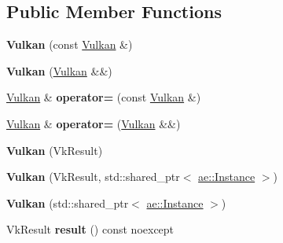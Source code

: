 \subsection*{Public Member Functions}
\begin{DoxyCompactItemize}
\item 
\hypertarget{classae_1_1error_1_1_vulkan_aa5a9db1b119cdba0e3833045764b8bc4}{}\label{classae_1_1error_1_1_vulkan_aa5a9db1b119cdba0e3833045764b8bc4} 
{\bfseries Vulkan} (const \hyperlink{classae_1_1error_1_1_vulkan}{Vulkan} \&)
\item 
\hypertarget{classae_1_1error_1_1_vulkan_a3b5c68df25fbe1acd003045560e2bb70}{}\label{classae_1_1error_1_1_vulkan_a3b5c68df25fbe1acd003045560e2bb70} 
{\bfseries Vulkan} (\hyperlink{classae_1_1error_1_1_vulkan}{Vulkan} \&\&)
\item 
\hypertarget{classae_1_1error_1_1_vulkan_a64ed9b7219098f2ebc4c9ecf3556e868}{}\label{classae_1_1error_1_1_vulkan_a64ed9b7219098f2ebc4c9ecf3556e868} 
\hyperlink{classae_1_1error_1_1_vulkan}{Vulkan} \& {\bfseries operator=} (const \hyperlink{classae_1_1error_1_1_vulkan}{Vulkan} \&)
\item 
\hypertarget{classae_1_1error_1_1_vulkan_a2809ae7dee506700aed8a1bf6206dd94}{}\label{classae_1_1error_1_1_vulkan_a2809ae7dee506700aed8a1bf6206dd94} 
\hyperlink{classae_1_1error_1_1_vulkan}{Vulkan} \& {\bfseries operator=} (\hyperlink{classae_1_1error_1_1_vulkan}{Vulkan} \&\&)
\item 
\hypertarget{classae_1_1error_1_1_vulkan_a190a9764342405a01574476f165219c4}{}\label{classae_1_1error_1_1_vulkan_a190a9764342405a01574476f165219c4} 
{\bfseries Vulkan} (Vk\+Result)
\item 
\hypertarget{classae_1_1error_1_1_vulkan_a6320fe60b0964cb06fdc7f9b5262fddd}{}\label{classae_1_1error_1_1_vulkan_a6320fe60b0964cb06fdc7f9b5262fddd} 
{\bfseries Vulkan} (Vk\+Result, std\+::shared\+\_\+ptr$<$ \hyperlink{classae_1_1_instance}{ae\+::\+Instance} $>$)
\item 
\hypertarget{classae_1_1error_1_1_vulkan_a2eea111f0a44c94afdf2034ffdecd5ab}{}\label{classae_1_1error_1_1_vulkan_a2eea111f0a44c94afdf2034ffdecd5ab} 
{\bfseries Vulkan} (std\+::shared\+\_\+ptr$<$ \hyperlink{classae_1_1_instance}{ae\+::\+Instance} $>$)
\item 
\hypertarget{classae_1_1error_1_1_vulkan_af6e6f9b5aca05c183ede13c9ec33698f}{}\label{classae_1_1error_1_1_vulkan_af6e6f9b5aca05c183ede13c9ec33698f} 
Vk\+Result {\bfseries result} () const noexcept
\item 
\hypertarget{classae_1_1error_1_1_vulkan_af518cf08c70dea6f366198f66e03bcd0}{}\label{classae_1_1error_1_1_vulkan_af518cf08c70dea6f366198f66e03bcd0} 

\end{DoxyCompactItemize}

